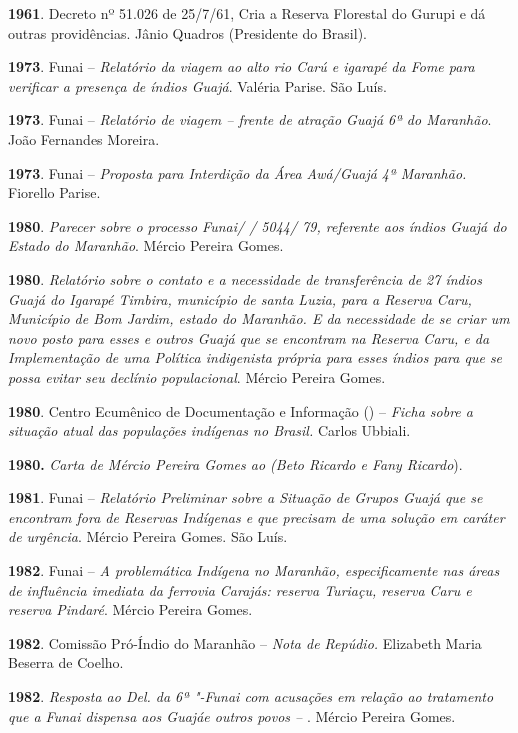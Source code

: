 \begin{Parskip}
\textbf{1961}. Decreto nº 51.026 de 25/7/61, Cria a Reserva Florestal do
Gurupi e dá outras providências. Jânio Quadros (Presidente do Brasil).

\textbf{1973}. Funai -- \emph{Relatório da viagem ao alto rio Carú e
igarapé da Fome para verificar a presença de índios Guajá}. Valéria
Parise. São Luís.

\textbf{1973}. Funai -- \emph{Relatório de viagem -- frente de atração
Guajá 6ª do Maranhão}. João Fernandes Moreira.

\textbf{1973}. Funai -- \emph{Proposta para Interdição da Área Awá/Guajá
4ª  Maranhão.} Fiorello Parise.

\textbf{1980}. \emph{Parecer sobre o processo Funai/ / 5044/ 79,
referente aos índios Guajá do Estado do Maranhão}. Mércio Pereira Gomes.

\textbf{1980}. \emph{Relatório sobre o contato e a necessidade de
transferência de 27 índios Guajá do Igarapé Timbira, município de santa
Luzia, para a Reserva Caru, Município de Bom Jardim, estado do Maranhão.
E da necessidade de se criar um novo posto para esses e outros Guajá que
se encontram na Reserva Caru, e da Implementação de uma Política
indigenista própria para esses índios para que se possa evitar seu
declínio populacional}. Mércio Pereira Gomes.

\textbf{1980}. Centro Ecumênico de Documentação e Informação () --
\emph{Ficha sobre a situação atual das populações indígenas no Brasil.}
Carlos Ubbiali.

\textbf{1980.} \emph{Carta de Mércio Pereira Gomes ao  (Beto Ricardo
e Fany Ricardo}).

\textbf{1981}. Funai -- \emph{Relatório Preliminar sobre a Situação de
Grupos Guajá que se encontram fora de Reservas Indígenas e que precisam
de uma solução em caráter de urgência}. Mércio Pereira Gomes. São Luís.

\textbf{1982}. Funai -- \emph{A problemática Indígena no Maranhão,
especificamente nas áreas de influência imediata da ferrovia Carajás:
reserva Turiaçu, reserva Caru e reserva Pindaré}. Mércio Pereira Gomes.

\textbf{1982}. Comissão Pró-Índio do Maranhão -- \emph{Nota de Repúdio.}
Elizabeth Maria Beserra de Coelho.

\textbf{1982}. \emph{Resposta ao Del. da 6ª "-Funai com acusações em
relação ao tratamento que a Funai dispensa aos Guajáe outros povos --
}. Mércio Pereira Gomes.


\end{Parskip}
